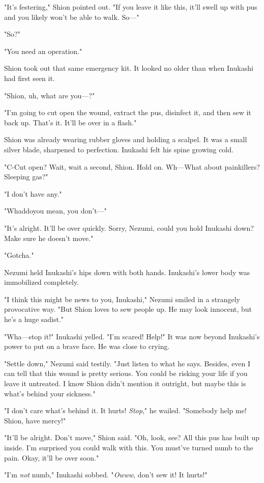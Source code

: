 "It's festering," Shion pointed out. "If you leave it like this, it'll
swell up with pus and you likely won't be able to walk. So---"

"So?"

"You need an operation."

Shion took out that same emergency kit. It looked no older than when
Inukashi had first seen it.

"Shion, uh, what are you---?"

"I'm going to cut open the wound, extract the pus, disinfect it, and
then sew it back up. That's it. It'll be over in a flash."

Shion was already wearing rubber gloves and holding a scalpel. It was a
small silver blade, sharpened to perfection. Inukashi felt his spine
growing cold.

"C-Cut open? Wait, wait a second, Shion. Hold on. Wh---What about
painkillers? Sleeping gas?"

"I don't have any."

"Whaddoyou mean, you don't---"

"It's alright. It'll be over quickly. Sorry, Nezumi, could you hold
Inukashi down? Make sure he doesn't move."

"Gotcha."

Nezumi held Inukashi's hips down with both hands. Inukashi's lower body
was immobilized completely.

"I think this might be news to you, Inukashi," Nezumi smiled in a
strangely provocative way. "But Shion loves to sew people up. He may
look innocent, but he's a huge sadist."

"Wha---stop it!" Inukashi yelled. "I'm scared! Help!" It was now beyond
Inukashi's power to put on a brave face. He was close to crying.

"Settle down," Nezumi said testily. "Just listen to what he says.
Besides, even I can tell that this wound is pretty serious. You could be
risking your life if you leave it untreated. I know Shion didn't mention
it outright, but maybe this is what's behind your sickness."

"I don't care what's behind it. It hurts! \emph{Stop}," he wailed. "Somebody
help me! Shion, have mercy!"

"It'll be alright. Don't move," Shion said. "Oh, look, see? All this pus
has built up inside. I'm surprised you could walk with this. You must've
turned numb to the pain. Okay, it'll be over soon."

"I'm \emph{not} numb," Inukashi sobbed. "\emph{Owww}, don't sew it! It hurts!"

